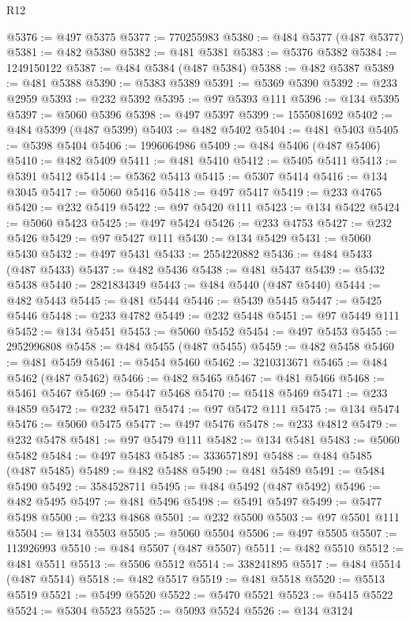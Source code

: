 \begin{lexlean}{R12}
\begin{coremodule}
@5376 := @497 @5375
@5377 := 770255983
@5380 := @484 @5377 (@487 @5377)
@5381 := @482 @5380
@5382 := @481 @5381
@5383 := @5376 @5382
@5384 := 1249150122
@5387 := @484 @5384 (@487 @5384)
@5388 := @482 @5387
@5389 := @481 @5388
@5390 := @5383 @5389
@5391 := @5369 @5390
@5392 := @233 @2959
@5393 := @232 @5392
@5395 := @97 @5393 @111
@5396 := @134 @5395
@5397 := @5060 @5396
@5398 := @497 @5397
@5399 := 1555081692
@5402 := @484 @5399 (@487 @5399)
@5403 := @482 @5402
@5404 := @481 @5403
@5405 := @5398 @5404
@5406 := 1996064986
@5409 := @484 @5406 (@487 @5406)
@5410 := @482 @5409
@5411 := @481 @5410
@5412 := @5405 @5411
@5413 := @5391 @5412
@5414 := @5362 @5413
@5415 := @5307 @5414
@5416 := @134 @3045
@5417 := @5060 @5416
@5418 := @497 @5417
@5419 := @233 @4765
@5420 := @232 @5419
@5422 := @97 @5420 @111
@5423 := @134 @5422
@5424 := @5060 @5423
@5425 := @497 @5424
@5426 := @233 @4753
@5427 := @232 @5426
@5429 := @97 @5427 @111
@5430 := @134 @5429
@5431 := @5060 @5430
@5432 := @497 @5431
@5433 := 2554220882
@5436 := @484 @5433 (@487 @5433)
@5437 := @482 @5436
@5438 := @481 @5437
@5439 := @5432 @5438
@5440 := 2821834349
@5443 := @484 @5440 (@487 @5440)
@5444 := @482 @5443
@5445 := @481 @5444
@5446 := @5439 @5445
@5447 := @5425 @5446
@5448 := @233 @4782
@5449 := @232 @5448
@5451 := @97 @5449 @111
@5452 := @134 @5451
@5453 := @5060 @5452
@5454 := @497 @5453
@5455 := 2952996808
@5458 := @484 @5455 (@487 @5455)
@5459 := @482 @5458
@5460 := @481 @5459
@5461 := @5454 @5460
@5462 := 3210313671
@5465 := @484 @5462 (@487 @5462)
@5466 := @482 @5465
@5467 := @481 @5466
@5468 := @5461 @5467
@5469 := @5447 @5468
@5470 := @5418 @5469
@5471 := @233 @4859
@5472 := @232 @5471
@5474 := @97 @5472 @111
@5475 := @134 @5474
@5476 := @5060 @5475
@5477 := @497 @5476
@5478 := @233 @4812
@5479 := @232 @5478
@5481 := @97 @5479 @111
@5482 := @134 @5481
@5483 := @5060 @5482
@5484 := @497 @5483
@5485 := 3336571891
@5488 := @484 @5485 (@487 @5485)
@5489 := @482 @5488
@5490 := @481 @5489
@5491 := @5484 @5490
@5492 := 3584528711
@5495 := @484 @5492 (@487 @5492)
@5496 := @482 @5495
@5497 := @481 @5496
@5498 := @5491 @5497
@5499 := @5477 @5498
@5500 := @233 @4868
@5501 := @232 @5500
@5503 := @97 @5501 @111
@5504 := @134 @5503
@5505 := @5060 @5504
@5506 := @497 @5505
@5507 := 113926993
@5510 := @484 @5507 (@487 @5507)
@5511 := @482 @5510
@5512 := @481 @5511
@5513 := @5506 @5512
@5514 := 338241895
@5517 := @484 @5514 (@487 @5514)
@5518 := @482 @5517
@5519 := @481 @5518
@5520 := @5513 @5519
@5521 := @5499 @5520
@5522 := @5470 @5521
@5523 := @5415 @5522
@5524 := @5304 @5523
@5525 := @5093 @5524
@5526 := @134 @3124

\end{coremodule}
\end{lexlean}
